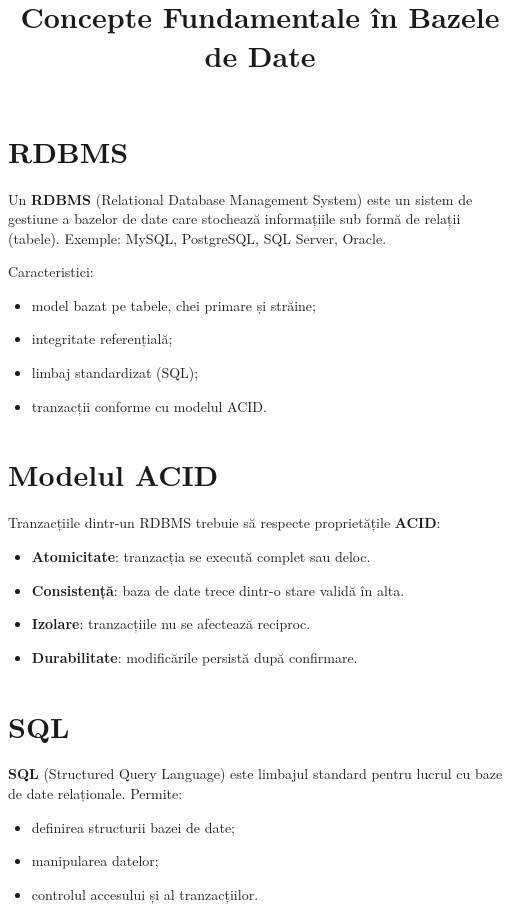 \documentclass[12pt,a4paper]{article}
\title{Concepte Fundamentale în Bazele de Date}
\author{}
\date{}
\begin{document}
\maketitle

\section{RDBMS}
Un \textbf{RDBMS} (Relational Database Management System) este un sistem de
gestiune a bazelor de date care stochează informațiile sub formă de relații
(tabele). Exemple: MySQL, PostgreSQL, SQL Server, Oracle.

Caracteristici:
\begin{itemize}[noitemsep]
    \item model bazat pe tabele, chei primare și străine;
    \item integritate referențială;
    \item limbaj standardizat (SQL);
    \item tranzacții conforme cu modelul ACID.
\end{itemize}

\section{Modelul ACID}
Tranzacțiile dintr-un RDBMS trebuie să respecte proprietățile \textbf{ACID}:
\begin{itemize}[noitemsep]
    \item \textbf{Atomicitate}: tranzacția se execută complet sau deloc.
    \item \textbf{Consistență}: baza de date trece dintr-o stare validă în alta.
    \item \textbf{Izolare}: tranzacțiile nu se afectează reciproc.
    \item \textbf{Durabilitate}: modificările persistă după confirmare.
\end{itemize}

\section{SQL}
\textbf{SQL} (Structured Query Language) este limbajul standard pentru lucrul cu
baze de date relaționale. Permite:
\begin{itemize}[noitemsep]
    \item definirea structurii bazei de date;
    \item manipularea datelor;
    \item controlul accesului și al tranzacțiilor.
\end{itemize}
\end{document}
